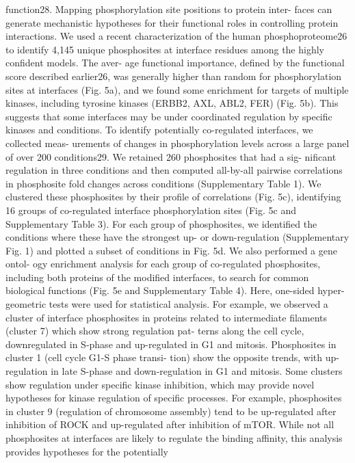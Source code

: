 function28. Mapping phosphorylation site positions to protein inter-
faces can generate mechanistic hypotheses for their functional roles in
controlling protein interactions. We used a recent characterization of
the human phosphoproteome26 to identify 4,145 unique phosphosites
at interface residues among the highly confident models. The aver-
age functional importance, defined by the functional score described
earlier26, was generally higher than random for phosphorylation sites
at interfaces (Fig. 5a), and we found some enrichment for targets of
multiple kinases, including tyrosine kinases (ERBB2, AXL, ABL2, FER)
(Fig. 5b). This suggests that some interfaces may be under coordinated
regulation by specific kinases and conditions.
To identify potentially co-regulated interfaces, we collected meas-
urements of changes in phosphorylation levels across a large panel of
over 200 conditions29. We retained 260 phosphosites that had a sig-
nificant regulation in three conditions and then computed all-by-all
pairwise correlations in phosphosite fold changes across conditions
(Supplementary Table 1). We clustered these phosphosites by their
profile of correlations (Fig. 5c), identifying 16 groups of co-regulated
interface phosphorylation sites (Fig. 5c and Supplementary Table 3). For
each group of phosphosites, we identified the conditions where these
have the strongest up- or down-regulation (Supplementary Fig. 1) and
plotted a subset of conditions in Fig. 5d. We also performed a gene ontol-
ogy enrichment analysis for each group of co-regulated phosphosites,
including both proteins of the modified interfaces, to search for common
biological functions (Fig. 5e and Supplementary Table 4). Here, one-sided
hyper-geometric tests were used for statistical analysis. For example,
we observed a cluster of interface phosphosites in proteins related to
intermediate filaments (cluster 7) which show strong regulation pat-
terns along the cell cycle, downregulated in S-phase and up-regulated
in G1 and mitosis. Phosphosites in cluster 1 (cell cycle G1-S phase transi-
tion) show the opposite trends, with up-regulation in late S-phase and
down-regulation in G1 and mitosis. Some clusters show regulation under
specific kinase inhibition, which may provide novel hypotheses for kinase
regulation of specific processes. For example, phosphosites in cluster
9 (regulation of chromosome assembly) tend to be up-regulated after
inhibition of ROCK and up-regulated after inhibition of mTOR.
While not all phosphosites at interfaces are likely to regulate the
binding affinity, this analysis provides hypotheses for the potentially
